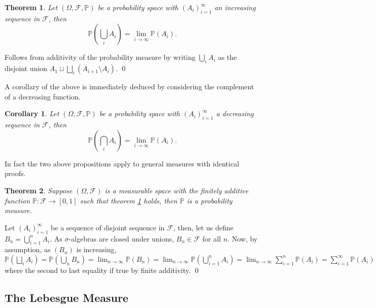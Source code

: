 \documentclass[
]{article}
\newtheorem{theorem}{Theorem}
\newtheorem{corollary}{Corollary}[theorem]
\theoremstyle{definition}
\begin{document}
\begin{theorem}\label{cont_pmeasure}
  Let \((\Omega, \mathcal{F}, \mathbb{P})\) be a probability space with 
  \((A_i)_{i = 1}^\infty\) an increasing sequence in \(\mathcal{F}\), then 
  \[\mathbb{P}\left(\bigcup_i A_i\right) = \lim_{i \to \infty} \mathbb{P}(A_i).\]
\end{theorem}
\proof

Follows from additivity of the probability measure by writing
\(\bigcup_i A_i\) as the disjoint union
\(A_1 \sqcup \bigsqcup_i (A_{i + 1} \setminus A_i)\). \qed

A corollary of the above is immediately deduced by considering the
complement of a decreasing function.

\begin{corollary}
  Let \((\Omega, \mathcal{F}, \mathbb{P})\) be a probability space with 
  \((A_i)_{i = 1}^\infty\) a decreasing sequence in \(\mathcal{F}\), then 
  \[\mathbb{P}\left(\bigcap_i A_i\right) = \lim_{i \to \infty} \mathbb{P}(A_i).\]
\end{corollary}

In fact the two above propositions apply to general measures with
identical proofs.

\begin{theorem}
  Suppose \((\Omega, \mathcal{F})\) is a measurable space with the finitely 
  additive function \(\mathbb{P} : \mathcal{F} \to [0, 1]\) such that theorem 
  \ref{cont_pmeasure} holds, then \(\mathbb{P}\) is a probability measure.
\end{theorem}
\proof

Let \((A_i)_{i = 1}^\infty\) be a sequence of disjoint sequence in
\(\mathcal{F}\), then, let us define \(B_n = \bigcup_{i = 1}^n A_i\). As
\(\sigma\)-algebras are closed under unions, \(B_n \in \mathcal{F}\) for
all \(n\). Now, by assumption, as \((B_n)\) is increasing,
\(\mathbb{P}\left(\bigsqcup_i A_i \right)  = \mathbb{P}\left(\bigcup_n B_n\right) = \lim_{n \to \infty} \mathbb{P}(B_n)  = \lim_{n \to \infty} \mathbb{P}\left(\bigcup_{i = 1}^n A_i \right)  = \lim_{n \to \infty} \sum_{i = 1}^n \mathbb{P}(A_i)  = \sum_{i = 1}^\infty \mathbb{P}(A_i)\)
where the second to last equality if true by finite additivity. \qed

\hypertarget{the-lebesgue-measure}{%
\subsection{The Lebesgue Measure}\label{the-lebesgue-measure}}
\end{document}
